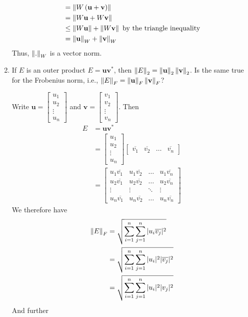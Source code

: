 \begin{enumerate}
\begin{solution}
\begin{align*}
        &=    \left\lVert W\left(\mathbf{u} + \mathbf{v}\right)\right\rVert\\
        &=    \left\lVert W\mathbf{u} + W\mathbf{v}\right\rVert\\
        &\leq \left\lVert W\mathbf{u}\right\rVert + \left\lVert W\mathbf{v}\right\rVert\text{ by the triangle inequality}\\
        &=    \left\lVert\mathbf{u}\right\rVert_W + \left\lVert\mathbf{v}\right\rVert_W
    \end{align*}
    Thus, \(\left\lVert.\right\rVert_W\) is a vector norm.
\end{solution}
\item If \(E\) is an outer product \(E=\mathbf{u}\mathbf{v}^*\), then \(\left\lVert E\right\rVert_2 = \left\lVert\mathbf{u}\right\rVert_2\left\lVert\mathbf{v}\right\rVert_2\). Is the same true for the Frobenius norm, i.e., \(\left\lVert E\right\rVert_F=\left\lVert\mathbf{u}\right\rVert_F \left\lVert\mathbf{v}\right\rVert_F\)?
\begin{solution}
Write \(\mathbf{u}=\begin{bmatrix}u_1 \\ u_2 \\ \vdots \\ u_n\end{bmatrix}\) and \(\mathbf{v}=\begin{bmatrix}v_1 \\ v_2 \\ \vdots \\ v_n\end{bmatrix}\). Then \begin{align*}E
    &= \mathbf{u}\mathbf{v}^*\\
    &= \begin{bmatrix}u_1 \\ u_2 \\ \vdots \\ u_n\end{bmatrix} \begin{bmatrix}\overline{v_1} & \overline{v_2} & \hdots & \overline{v_n}\end{bmatrix}\\
    &= \begin{bmatrix}u_1\overline{v_1} & u_1\overline{v_2} & \hdots & u_1\overline{v_n}\\u_2\overline{v_1} & u_2\overline{v_2} & \hdots & u_2\overline{v_n}\\\vdots & \vdots & \ddots & \vdots \\ u_n\overline{v_1} & u_n\overline{v_2} & \hdots & u_n\overline{v_n}\end{bmatrix}
\end{align*}
We therefore have \begin{align*}\left\lVert E\right\rVert_F&=\sqrt{\sum_{i=1}^n\sum_{j=1}^n|u_i\overline{v_j}|^2}\\&=\sqrt{\sum_{i=1}^n\sum_{j=1}^n|u_i|^2|\overline{v_j}|^2}\\&=\sqrt{\sum_{i=1}^n\sum_{j=1}^n|u_i|^2|v_j|^2}\end{align*} And further

\end{solution}
\end{enumerate}
